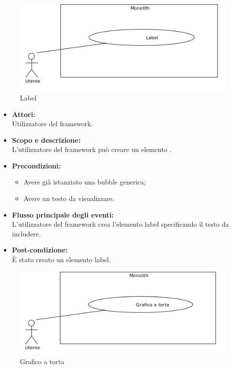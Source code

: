 
\begin{figure}[H]
	\centering
	\includegraphics[width=15cm]{../../documenti/AnalisiDeiRequisiti/Diagrammi_img/uc1_27.png}
	\caption{\UCFFCaption{} Label}
\end{figure}

\begin{itemize}
	\item \textbf{Attori:}
	\\Utilizzatore del framework.
	\item \textbf{Scopo e descrizione:} 
	\\L'utilizzatore del framework può creare un elemento .
	\item \textbf{Precondizioni:}
	\begin{itemize}
		\item Avere già istanziato una bubble generica;
		\item Avere un testo da visualizzare.
	\end{itemize}
	\item \textbf{Flusso principale degli eventi:}
	\\L'utilizzatore del framework crea l'elemento label specificando il testo da includere.
	\item \textbf{Post-condizione:}
	\\È stato creato un elemento label.
\end{itemize}


\begin{figure}[H]
	\centering
	\includegraphics[width=15cm]{../../documenti/AnalisiDeiRequisiti/Diagrammi_img/uc1_28.png}
	\caption{\UCFFCaption{} Grafico a torta}
\end{figure}

